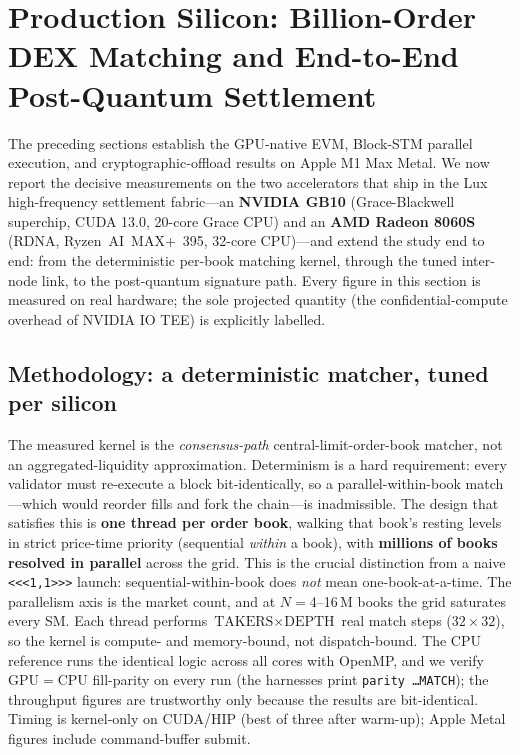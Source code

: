 \section{Production Silicon: Billion-Order DEX Matching and End-to-End Post-Quantum Settlement}
\label{sec:production}

The preceding sections establish the GPU-native EVM, Block-STM parallel execution, and
cryptographic-offload results on Apple M1 Max Metal. We now report the decisive measurements on
the two accelerators that ship in the Lux high-frequency settlement fabric---an
\textbf{NVIDIA GB10} (Grace-Blackwell superchip, CUDA 13.0, 20-core Grace CPU) and an
\textbf{AMD Radeon 8060S} (RDNA, Ryzen~AI~MAX+~395, 32-core CPU)---and extend the study end to
end: from the deterministic per-book matching kernel, through the tuned inter-node link, to the
post-quantum signature path. Every figure in this section is measured on real hardware; the
sole projected quantity (the confidential-compute overhead of NVIDIA IO TEE) is explicitly
labelled.

\subsection{Methodology: a deterministic matcher, tuned per silicon}
\label{sec:production-method}

The measured kernel is the \emph{consensus-path} central-limit-order-book matcher, not an
aggregated-liquidity approximation. Determinism is a hard requirement: every validator must
re-execute a block bit-identically, so a parallel-within-book match---which would reorder
fills and fork the chain---is inadmissible. The design that satisfies this is \textbf{one thread
per order book}, walking that book's resting levels in strict price-time priority (sequential
\emph{within} a book), with \textbf{millions of books resolved in parallel} across the grid. This
is the crucial distinction from a naive \verb|<<<1,1>>>| launch: sequential-within-book does
\emph{not} mean one-book-at-a-time. The parallelism axis is the market count, and at $N=$4--16\,M
books the grid saturates every SM. Each thread performs $\text{TAKERS}\times\text{DEPTH}$ real
match steps ($32\times32$), so the kernel is compute- and memory-bound, not dispatch-bound. The
CPU reference runs the identical logic across all cores with OpenMP, and we verify GPU$=$CPU
fill-parity on every run (the harnesses print \texttt{parity \dots MATCH}); the throughput
figures are trustworthy only because the results are bit-identical. Timing is kernel-only on
CUDA/HIP (best of three after warm-up); Apple Metal figures include command-buffer submit.

